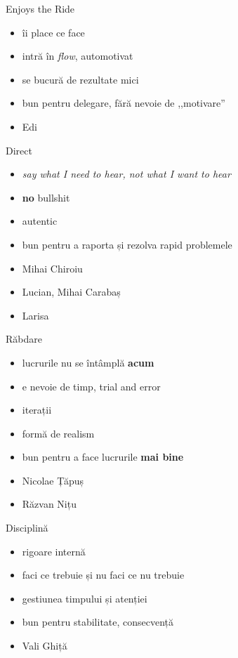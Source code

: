 \documentclass{beamer}
\begin{document}
\begin{frame}{Enjoys the Ride}
  \begin{itemize}
    \pause \item îi place ce face
    \pause \item intră în \textit{flow}, automotivat
    \pause \item se bucură de rezultate mici
    \pause \item bun pentru delegare, fără nevoie de ,,motivare''
    \pause \item Edi
  \end{itemize}
\end{frame}

\begin{frame}{Direct}
  \begin{itemize}
    \pause \item \textit{say what I need to hear, not what I want to hear}
    \pause \item \textbf{no} bullshit
    \pause \item autentic
    \pause \item bun pentru a raporta și rezolva rapid problemele
    \pause \item Mihai Chiroiu
    \pause \item Lucian, Mihai Carabaș
    \pause \item Larisa
  \end{itemize}
\end{frame}

\begin{frame}{Răbdare}
  \begin{itemize}
    \pause \item lucrurile nu se întâmplă \textbf{acum}
    \pause \item e nevoie de timp, trial and error
    \pause \item iterații
    \pause \item formă de realism
    \pause \item bun pentru a face lucrurile \textbf{mai bine}
    \pause \item Nicolae Țăpuș
    \pause \item Răzvan Nițu
  \end{itemize}
\end{frame}

\begin{frame}{Disciplină}
  \begin{itemize}
    \pause \item rigoare internă
    \pause \item faci ce trebuie și nu faci ce nu trebuie
    \pause \item gestiunea timpului și atenției
    \pause \item bun pentru stabilitate, consecvență
    \pause \item Vali Ghiță
  \end{itemize}
\end{frame}
\end{document}
